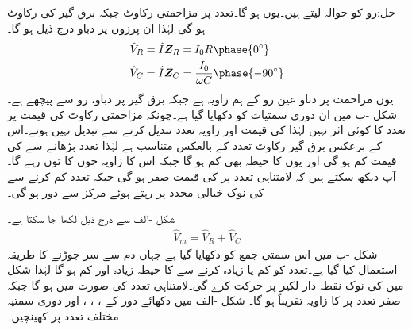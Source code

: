 حل:رو کو حوالہ لیتے ہیں۔یوں  ہو گا۔تعدد  پر مزاحمتی رکاوٹ  جبکہ  برق گیر کی رکاوٹ  ہو گی لہٰذا ان پرزوں پر دباو درج ذیل ہو گا۔
\begin{align*}
\hat{V}_R&=\hat{I} \bZ_R=I_0 R \phase{0^{\circ}}\\
\hat{V}_C&=\hat{I} \bZ_C=\frac{I_0}{ \omega C} \phase{-90^{\circ}}
\end{align*}
یوں مزاحمت پر دباو عین رو کے ہم زاویہ ہے جبکہ برق گیر پر دباو، رو سے  پیچھے ہے۔شکل -ب میں ان دوری سمتیات کو دکھایا گیا ہے۔چونکہ مزاحمتی رکاوٹ کی قیمت پر تعدد کا کوئی اثر نہیں لہٰذا  کی قیمت اور زاویہ تعدد تبدیل کرنے سے تبدیل نہیں ہوتے۔اس کے برعکس برق گیر رکاوٹ تعدد کے بالعکس متناسب ہے لہٰذا تعدد بڑھانے سے  کی قیمت کم ہو گی اور یوں  کا حیطہ بھی کم ہو گا جبکہ اس کا زاویہ جوں کا توں رہے گا۔آپ دیکھ سکتے ہیں کہ لامتناہی تعدد پر  کی قیمت صفر ہو گی جبکہ تعدد کم کرنے سے  کی نوک خیالی محدد پر رہتے ہوئے  مرکز سے دور ہو گی۔

شکل -الف سے درج ذیل لکھا جا سکتا ہے۔
\begin{align*}
\hat{V}_m=\hat{V}_R+\hat{V}_C
\end{align*}
شکل -پ میں اس سمتی جمع کو دکھایا گیا ہے جہاں دم سے سر جوڑنے کا طریقہ استعمال کیا گیا ہے۔تعدد کو کم یا زیادہ کرنے  سے  کا حیطہ زیادہ اور کم ہو گا لہٰذا شکل میں  کی نوک نقطہ دار لکیر پر حرکت کرے گی۔لامتناہی تعدد کی صورت میں  ہو گا جبکہ صفر  تعدد پر  کا زاویہ تقریباً  ہو گا۔ 
شکل -الف  میں دکھائے دور کے  ، ، ،  اور  دوری سمتیہ مختلف تعدد پر کھینچیں۔


